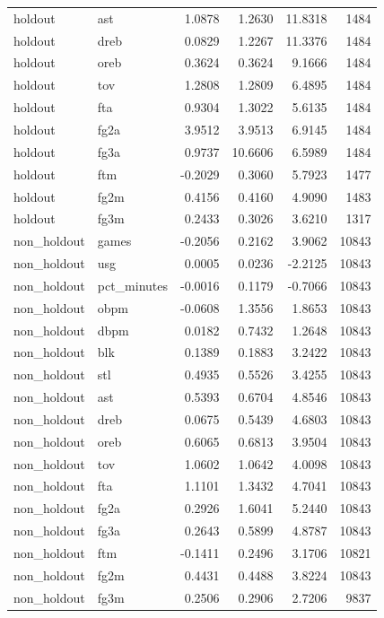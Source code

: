 \begin{table}
\begin{tabular}{llrrrr}
holdout & ast & 1.0878 & 1.2630 & 11.8318 & 1484 \\
holdout & dreb & 0.0829 & 1.2267 & 11.3376 & 1484 \\
holdout & oreb & 0.3624 & 0.3624 & 9.1666 & 1484 \\
holdout & tov & 1.2808 & 1.2809 & 6.4895 & 1484 \\
holdout & fta & 0.9304 & 1.3022 & 5.6135 & 1484 \\
holdout & fg2a & 3.9512 & 3.9513 & 6.9145 & 1484 \\
holdout & fg3a & 0.9737 & 10.6606 & 6.5989 & 1484 \\
holdout & ftm & -0.2029 & 0.3060 & 5.7923 & 1477 \\
holdout & fg2m & 0.4156 & 0.4160 & 4.9090 & 1483 \\
holdout & fg3m & 0.2433 & 0.3026 & 3.6210 & 1317 \\
non\_holdout & games & -0.2056 & 0.2162 & 3.9062 & 10843 \\
non\_holdout & usg & 0.0005 & 0.0236 & -2.2125 & 10843 \\
non\_holdout & pct\_minutes & -0.0016 & 0.1179 & -0.7066 & 10843 \\
non\_holdout & obpm & -0.0608 & 1.3556 & 1.8653 & 10843 \\
non\_holdout & dbpm & 0.0182 & 0.7432 & 1.2648 & 10843 \\
non\_holdout & blk & 0.1389 & 0.1883 & 3.2422 & 10843 \\
non\_holdout & stl & 0.4935 & 0.5526 & 3.4255 & 10843 \\
non\_holdout & ast & 0.5393 & 0.6704 & 4.8546 & 10843 \\
non\_holdout & dreb & 0.0675 & 0.5439 & 4.6803 & 10843 \\
non\_holdout & oreb & 0.6065 & 0.6813 & 3.9504 & 10843 \\
non\_holdout & tov & 1.0602 & 1.0642 & 4.0098 & 10843 \\
non\_holdout & fta & 1.1101 & 1.3432 & 4.7041 & 10843 \\
non\_holdout & fg2a & 0.2926 & 1.6041 & 5.2440 & 10843 \\
non\_holdout & fg3a & 0.2643 & 0.5899 & 4.8787 & 10843 \\
non\_holdout & ftm & -0.1411 & 0.2496 & 3.1706 & 10821 \\
non\_holdout & fg2m & 0.4431 & 0.4488 & 3.8224 & 10843 \\
non\_holdout & fg3m & 0.2506 & 0.2906 & 2.7206 & 9837 \\
\bottomrule
\end{tabular}
\end{table}
